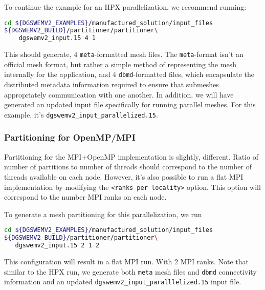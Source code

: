 To continue the example for an HPX parallelization, we recommend running:
\begin{lstlisting}[language=bash]
cd ${DGSWEMV2_EXAMPLES}/manufactured_solution/input_files
${DGSWEMV2_BUILD}/partitioner/partitioner\
    dgswemv2_input.15 4 1
\end{lstlisting}
This should generate, 4 \lstinline{meta}-formatted mesh files. The \lstinline{meta}-format isn't an official mesh format, but rather a simple method of representing the mesh internally for the  application, and 4 \lstinline{dbmd}-formatted files, which encapsulate the distributed metadata information required to ensure that submeshes appropriately communication with one another. In addition, we will have generated an updated input file specifically for running parallel meshes. For this example, it's 
\lstinline{dgswemv2_input_parallelized.15}.

\subsubsection{Partitioning for OpenMP/MPI}
Partitioning for the MPI+OpenMP implementation is slightly, different. Ratio of number of partitions to number of threads should correspond to the number of threads available on each node. However, it's also possible to run a flat MPI implementation by modifying the \lstinline{<ranks per locality>} option. This option will correspond to the number MPI ranks on each node. 

To generate a mesh partitioning for this parallelization, we run
\begin{lstlisting}[language=bash]
cd ${DGSWEMV2_EXAMPLES}/manufactured_solution/input_files
${DGSWEMV2_BUILD}/partitioner/partitioner\
   dgswemv2_input.15 2 1 2
\end{lstlisting}
This configuration will result in a flat MPI run. With 2 MPI ranks. Note that similar to the HPX run, we generate both \lstinline{meta} mesh files and \lstinline{dbmd} connectivity information and an updated \lstinline{dgswemv2_input_paralllelized.15} input file.
